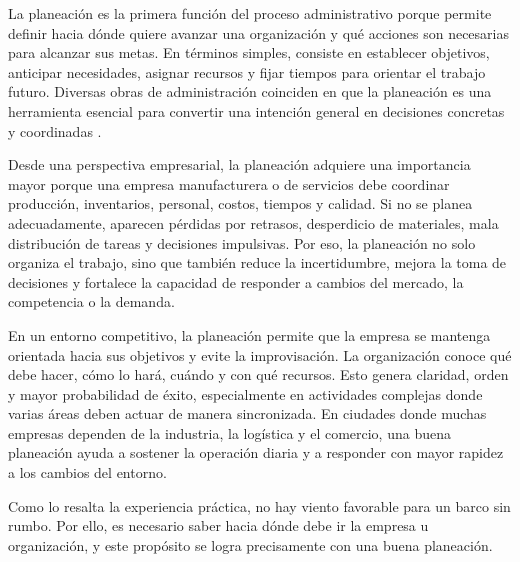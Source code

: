 La planeación es la primera función del proceso administrativo porque permite definir hacia dónde quiere avanzar una organización y qué acciones son necesarias para alcanzar sus metas. En términos simples, consiste en establecer objetivos, anticipar necesidades, asignar recursos y fijar tiempos para orientar el trabajo futuro. Diversas obras de administración coinciden en que la planeación es una herramienta esencial para convertir una intención general en decisiones concretas y coordinadas \parencite{robbins2017,bateman2020}.

Desde una perspectiva empresarial, la planeación adquiere una importancia mayor porque una empresa manufacturera o de servicios debe coordinar producción, inventarios, personal, costos, tiempos y calidad. Si no se planea adecuadamente, aparecen pérdidas por retrasos, desperdicio de materiales, mala distribución de tareas y decisiones impulsivas. Por eso, la planeación no solo organiza el trabajo, sino que también reduce la incertidumbre, mejora la toma de decisiones y fortalece la capacidad de responder a cambios del mercado, la competencia o la demanda.

En un entorno competitivo, la planeación permite que la empresa se mantenga orientada hacia sus objetivos y evite la improvisación. La organización conoce qué debe hacer, cómo lo hará, cuándo y con qué recursos. Esto genera claridad, orden y mayor probabilidad de éxito, especialmente en actividades complejas donde varias áreas deben actuar de manera sincronizada. En ciudades donde muchas empresas dependen de la industria, la logística y el comercio, una buena planeación ayuda a sostener la operación diaria y a responder con mayor rapidez a los cambios del entorno.

Como lo resalta la experiencia práctica, no hay viento favorable para un barco sin rumbo. Por ello, es necesario saber hacia dónde debe ir la empresa u organización, y este propósito se logra precisamente con una buena planeación.